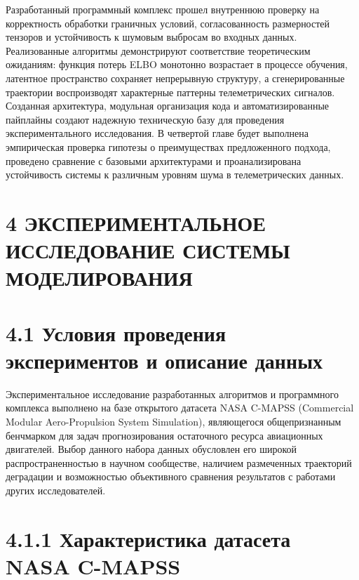 \documentclass[14pt, a4paper, oneside]{extreport}
\begin{document}
Разработанный программный комплекс прошел внутреннюю проверку на корректность обработки граничных условий, согласованность размерностей тензоров и устойчивость к шумовым выбросам во входных данных. Реализованные алгоритмы демонстрируют соответствие теоретическим ожиданиям: функция потерь ELBO монотонно возрастает в процессе обучения, латентное пространство сохраняет непрерывную структуру, а сгенерированные траектории воспроизводят характерные паттерны телеметрических сигналов. Созданная архитектура, модульная организация кода и автоматизированные пайплайны создают надежную техническую базу для проведения экспериментального исследования. В четвертой главе будет выполнена эмпирическая проверка гипотезы о преимуществах предложенного подхода, проведено сравнение с базовыми архитектурами и проанализирована устойчивость системы к различным уровням шума в телеметрических данных.

\clearpage





\section{4 ЭКСПЕРИМЕНТАЛЬНОЕ ИССЛЕДОВАНИЕ СИСТЕМЫ МОДЕЛИРОВАНИЯ}
\section{4.1 Условия проведения экспериментов и описание данных}
\vspace{1em}

Экспериментальное исследование разработанных алгоритмов и программного комплекса выполнено на базе открытого датасета NASA C-MAPSS (Commercial Modular Aero-Propulsion System Simulation), являющегося общепризнанным бенчмарком для задач прогнозирования остаточного ресурса авиационных двигателей. Выбор данного набора данных обусловлен его широкой распространенностью в научном сообществе, наличием размеченных траекторий деградации и возможностью объективного сравнения результатов с работами других исследователей.

\vspace{1em}
\section{4.1.1 Характеристика датасета NASA C-MAPSS}
\vspace{1em}
\end{document}
